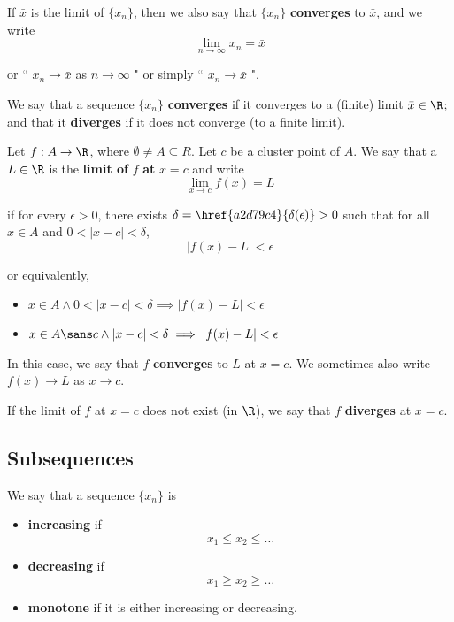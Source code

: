 \label{de3e28a}

\begin{enumerati}
  \item If $\bar x$ is the limit of $\{x_n\}$, then we also say that $\{x_n\}$
        \textbf{converges} to $\bar x$, and we write
  $$
    \lim_{n\to\infty}x_n=\bar x
  $$

  or `` $x_n\to\bar x$ as $n\to\infty$ " or simply `` $x_n\to\bar x$ ".
  \item We say that a sequence $\{x_n\}$ \textbf{converges} if it converges to
        a (finite) limit $\bar x\in\R$; and that it \textbf{diverges} if it
        does not converge (to a finite limit).
\end{enumerati}

\label{d2d461a}

Let $f:A\to\R$, where $\emptyset\neq A\subseteq R$. Let $c$ be a
\href{b0219cd}{cluster point} of $A$. We say that a $L\in\R$ is the
\textbf{limit of} $f$ \textbf{at} $x=c$ and write
$$
  \lim_{x\to c}f(x)=L
$$

if for every $\epsilon>0$, there exists
$\delta=\href{a2d79c4}{\delta(\epsilon)}>0$ such that for all $x\in A$ and
$0<|x-c|<\delta$,
$$
  |f(x)-L|<\epsilon
$$

or equivalently,
\begin{itemize}
  \item $x\in A\land0<|x-c|<\delta\implies|f(x)-L|<\epsilon$
  \item $x\in A\sans c\land|x-c|<\delta\implies|f(x)-L|<\epsilon$
\end{itemize}

In this case, we say that $f$ \textbf{converges} to $L$ at $x=c$. We sometimes
also write $f(x)\to L$ as $x\to c$.

If the limit of $f$ at $x=c$ does not exist (in $\R$), we say that $f$
\textbf{diverges} at $x=c$.

\subsection{Subsequences}\label{aff9ce6}

\label{feae1b2}

We say that a sequence $\{x_n\}$ is
\begin{itemize}
  \item \textbf{increasing} if
        $$
          x_1\leq x_2\leq\ldots
        $$
  \item \textbf{decreasing} if
        $$
          x_1\geq x_2\geq\ldots
        $$
  \item \textbf{monotone} if it is either increasing or decreasing.
\end{itemize}

